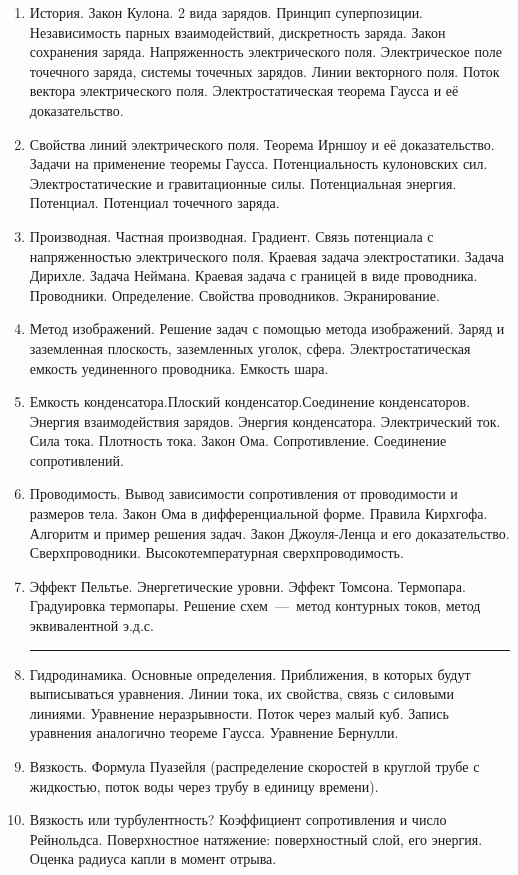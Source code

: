 \documentclass[12pt,a4paper,oneside,draft]{scrartcl}
\begin{document}
\begin{enumerate}
\item История.  Закон Кулона. 2 вида зарядов.  Принцип
  суперпозиции. Независимость парных взаимодействий, дискретность
  заряда. Закон сохранения заряда. Напряженность электрического
  поля. Электрическое поле точечного заряда, системы точечных зарядов.
  Линии векторного поля. Поток вектора электрического поля.
  Электростатическая теорема Гаусса и её доказательство.
\item Свойства линий электрического поля. Теорема Ирншоу и её
  доказательство. Задачи на применение теоремы Гаусса.
  Потенциальность кулоновских сил. Электростатические и гравитационные
  силы. Потенциальная энергия. Потенциал. Потенциал точечного заряда.
\item Производная. Частная производная. Градиент. Связь потенциала с
  напряженностью электрического поля. Краевая задача
  электростатики. Задача Дирихле. Задача Неймана. Краевая задача с
  границей в виде проводника.  Проводники. Определение. Свойства
  проводников. Экранирование.
\item Метод изображений. Решение задач с помощью метода изображений.
  Заряд и заземленная плоскость, заземленных уголок, сфера.
  Электростатическая емкость уединенного проводника. Емкость шара.
\item Емкость конденсатора.Плоский конденсатор.Соединение
  конденсаторов. Энергия взаимодействия зарядов. Энергия
  конденсатора. Электрический ток. Сила тока. Плотность тока. Закон
  Ома. Сопротивление. Соединение сопротивлений.
\item Проводимость. Вывод зависимости сопротивления от проводимости и
  размеров тела. Закон Ома в дифференциальной форме. Правила
  Кирхгофа. Алгоритм и пример решения задач. Закон Джоуля-Ленца и его
  доказательство. Сверхпроводники. Высокотемпературная
  сверхпроводимость.
\item Эффект Пельтье. Энергетические уровни. Эффект
  Томсона. Термопара. Градуировка термопары. Решение схем~---~метод
  контурных токов, метод эквивалентной э.д.с.
\smallskip
\hrule
\item Гидродинамика. Основные определения. Приближения, в которых
  будут выписываться уравнения. Линии тока, их свойства, связь с
  силовыми линиями. Уравнение неразрывности. Поток через малый
  куб. Запись уравнения аналогично теореме Гаусса. Уравнение Бернулли.
\item Вязкость. Формула Пуазейля (распределение скоростей в
  круглой трубе с жидкостью, поток воды через трубу в единицу
  времени).
\item Вязкость или турбулентность? Коэффициент сопротивления и число
  Рейнольдса. Поверхностное натяжение: поверхностный слой, его
  энергия. Оценка радиуса капли в момент отрыва.

\end{enumerate}
\end{document}
